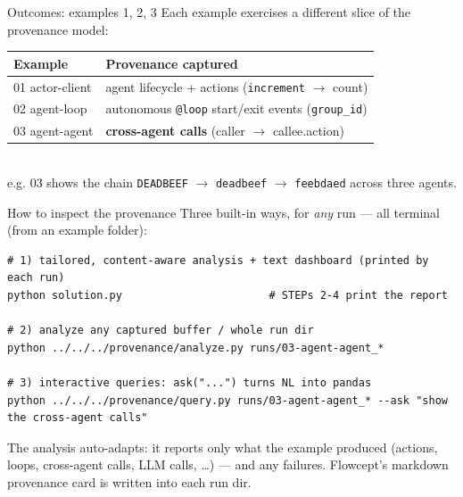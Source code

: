 \documentclass[aspectratio=169,11pt]{beamer}
\begin{document}
\begin{frame}{Outcomes: examples 1, 2, 3}
  Each example exercises a different slice of the provenance model:
  \vspace{0.4em}
  \begin{tabular}{l l}
    \toprule
    \textbf{Example} & \textbf{Provenance captured} \\
    \midrule
    01 actor-client & agent lifecycle + actions (\texttt{increment} $\to$ count) \\
    02 agent-loop & autonomous \texttt{@loop} start/exit events (\texttt{group\_id}) \\
    03 agent-agent & \textbf{cross-agent calls} (caller $\to$ callee.action) \\
    \bottomrule
  \end{tabular}
  \vspace{0.6em}\\
  \small e.g. 03 shows the chain \texttt{DEADBEEF} $\to$ \texttt{deadbeef} $\to$
  \texttt{feebdaed} across three agents.
\end{frame}

\begin{frame}[fragile]{How to inspect the provenance}
  Three built-in ways, for \emph{any} run --- all terminal (from an example folder):
\begin{lstlisting}[style=sh]
# 1) tailored, content-aware analysis + text dashboard (printed by each run)
python solution.py                       # STEPs 2-4 print the report

# 2) analyze any captured buffer / whole run dir
python ../../../provenance/analyze.py runs/03-agent-agent_*

# 3) interactive queries: ask("...") turns NL into pandas
python ../../../provenance/query.py runs/03-agent-agent_* --ask "show the cross-agent calls"
\end{lstlisting}
  \small The analysis auto-adapts: it reports only what the example produced
  (actions, loops, cross-agent calls, LLM calls, \dots) --- and any failures.
  Flowcept's markdown provenance card is written into each run dir.
\end{frame}
\end{document}
